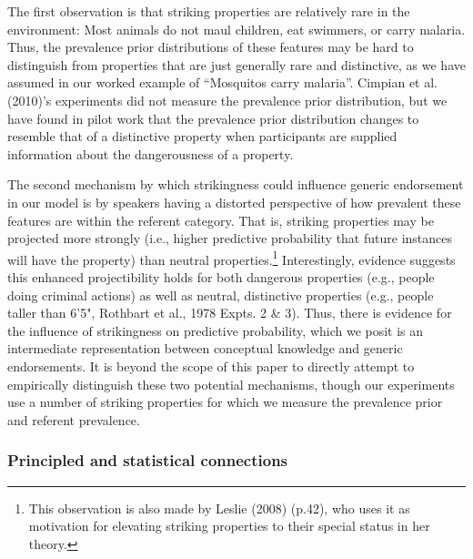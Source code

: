 \documentclass[english,,man,floatsintext]{apa6}
\let\rmarkdownfootnote\footnote%
\def\footnote{\protect\rmarkdownfootnote}
\theoremstyle{definition}
\theoremstyle{definition}
\theoremstyle{definition}
\theoremstyle{remark}
\begin{document}
The first observation is that striking properties are relatively rare in
the environment: Most animals do not maul children, eat swimmers, or
carry malaria. Thus, the prevalence prior distributions of these
features may be hard to distinguish from properties that are just
generally rare and distinctive, as we have assumed in our worked example
of \enquote{Mosquitos carry malaria}. Cimpian et al. (2010)'s
experiments did not measure the prevalence prior distribution, but we
have found in pilot work that the prevalence prior distribution changes
to resemble that of a distinctive property when participants are
supplied information about the dangerousness of a property.

The second mechanism by which strikingness could influence generic
endorsement in our model is by speakers having a distorted perspective
of how prevalent these features are within the referent category. That
is, striking properties may be projected more strongly (i.e., higher
predictive probability that future instances will have the property)
than neutral properties.\footnote{This observation is also made by
  Leslie (2008) (p.42), who uses it as motivation for elevating striking
  properties to their special status in her theory.} Interestingly,
evidence suggests this enhanced projectibility holds for both dangerous
properties (e.g., people doing criminal actions) as well as neutral,
distinctive properties (e.g., people taller than 6'5", Rothbart et al.,
1978 Expts. 2 \& 3). Thus, there is evidence for the influence of
strikingness on predictive probability, which we posit is an
intermediate representation between conceptual knowledge and generic
endorsements. It is beyond the scope of this paper to directly attempt
to empirically distinguish these two potential mechanisms, though our
experiments use a number of striking properties for which we measure the
prevalence prior and referent prevalence.

\hypertarget{principled-and-statistical-connections}{%
\subsubsection{Principled and statistical
connections}\label{principled-and-statistical-connections}}
\end{document}
